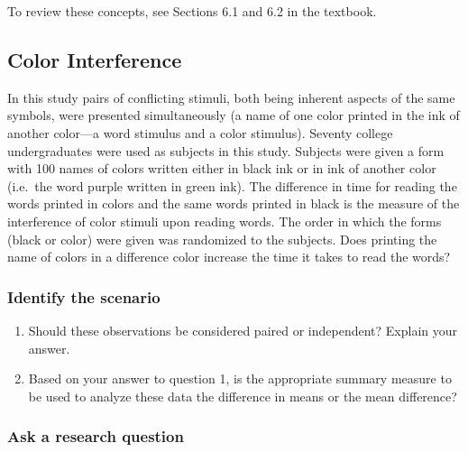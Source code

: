 \documentclass[
]{report}
\begin{document}
To review these concepts, see Sections 6.1 and 6.2 in the textbook.

\hypertarget{color-interference}{%
\subsection{Color Interference}\label{color-interference}}

In this study pairs of conflicting stimuli, both being inherent aspects of the same symbols, were presented simultaneously (a name of one color printed in the ink of another color---a word stimulus and a color stimulus). Seventy college undergraduates were used as subjects in this study. Subjects were given a form with 100 names of colors written either in black ink or in ink of another color (i.e.~the word purple written in green ink). The difference in time for reading the words printed in colors and the same words printed in black is the measure of the interference of color stimuli upon reading words. The order in which the forms (black or color) were given was randomized to the subjects. Does printing the name of colors in a difference color increase the time it takes to read the words?

\hypertarget{identify-the-scenario}{%
\subsubsection*{Identify the scenario}\label{identify-the-scenario}}

\begin{enumerate}
\def\labelenumi{\arabic{enumi}.}
\item
  Should these observations be considered paired or independent? Explain your answer.
  \vspace{0.5in}
\item
  Based on your answer to question 1, is the appropriate summary measure to be used to analyze these data the difference in means or the mean difference?
  \vspace{0.25in}
\end{enumerate}

\hypertarget{ask-a-research-question-3}{%
\subsubsection*{Ask a research question}\label{ask-a-research-question-3}}
\end{document}
